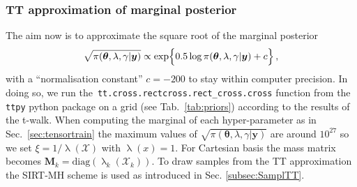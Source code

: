\subsubsection{TT approximation of marginal posterior}
The aim now is to approximate the square root of the marginal posterior
\begin{align}
	\begin{split}
		\sqrt{\pi( \bm{\theta},\lambda,\gamma  | \bm{y})} \propto  \exp\Bigl\{ 0.5\log{\pi( \bm{\theta},\lambda,\gamma  | \bm{y}) } + c \Bigr\}  
	\end{split} \, ,
	\label{eq:MargPostFullTT}
\end{align}
with a ``normalisation constant'' $c=-200$ to stay within computer precision.
In doing so, we run the~\texttt{tt.cross.rectcross.rect\_cross.cross} function from the \texttt{ttpy} python package \cite{Oseledets2018ttpy} on a grid (see Tab.~\ref{tab:priors}) according to the results of the t-walk.
When computing the marginal of each hyper-parameter as in Sec.~\ref{sec:tensortrain} the maximum values of $\sqrt{\pi( \bm{\theta},\lambda,\gamma  | \bm{y})}$ are around $10^{27}$ so we set $\xi = 1 / \uplambda (\mathcal{X})$ with $\uplambda(x) = 1$.
For Cartesian basis the mass matrix becomes $\bm{M}_k = \text{diag}(\uplambda_k(\mathcal{X}_k))$.
To draw samples from the TT approximation the SIRT-MH scheme is used as introduced in Sec. \ref{subsec:SamplTT}.

